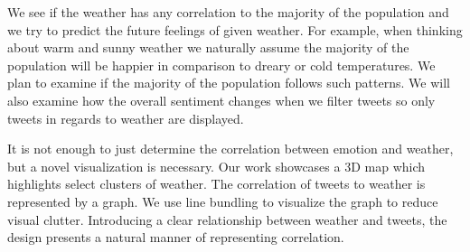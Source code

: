 We see if the weather has any correlation to the majority of the population and we try to predict the future feelings of given weather. For example, when thinking about warm and sunny weather we naturally assume the majority of the population will be happier in comparison to dreary or cold temperatures. We plan to examine if the majority of the population follows such patterns. We will also examine how the overall sentiment changes when we filter tweets so only tweets in regards to weather are displayed.

It is not enough to just determine the correlation between emotion and weather, but a novel visualization is necessary. Our work showcases a 3D map which highlights select clusters of weather. The correlation of tweets to weather is represented by a graph. We use line bundling to visualize the graph to reduce visual clutter. Introducing a clear relationship between weather and tweets, the design presents a natural manner of representing correlation. 
